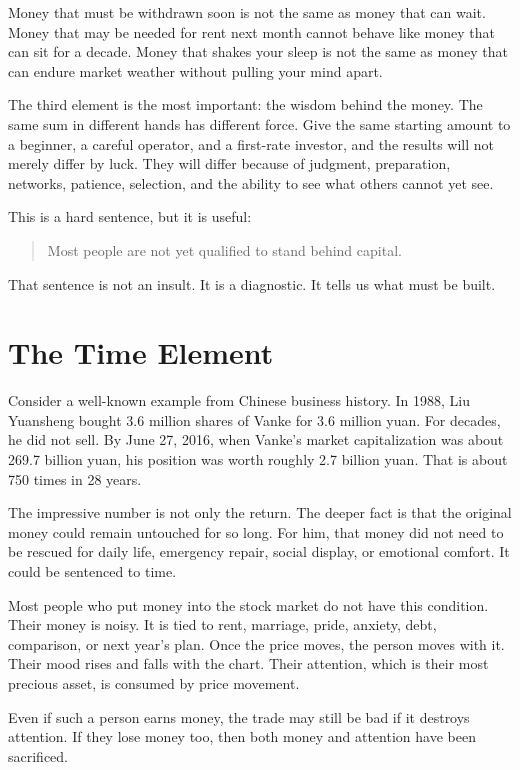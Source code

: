 Money that must be withdrawn soon is not the same as money that can wait. Money that may be needed for rent next month cannot behave like money that can sit for a decade. Money that shakes your sleep is not the same as money that can endure market weather without pulling your mind apart.

The third element is the most important: the wisdom behind the money. The same sum in different hands has different force. Give the same starting amount to a beginner, a careful operator, and a first-rate investor, and the results will not merely differ by luck. They will differ because of judgment, preparation, networks, patience, selection, and the ability to see what others cannot yet see.

This is a hard sentence, but it is useful:

\begin{quote}
Most people are not yet qualified to stand behind capital.
\end{quote}

That sentence is not an insult. It is a diagnostic. It tells us what must be built.

\section*{The Time Element}

Consider a well-known example from Chinese business history. In 1988, Liu Yuansheng bought 3.6 million shares of Vanke for 3.6 million yuan. For decades, he did not sell. By June 27, 2016, when Vanke's market capitalization was about 269.7 billion yuan, his position was worth roughly 2.7 billion yuan. That is about 750 times in 28 years.

The impressive number is not only the return. The deeper fact is that the original money could remain untouched for so long. For him, that money did not need to be rescued for daily life, emergency repair, social display, or emotional comfort. It could be sentenced to time.

Most people who put money into the stock market do not have this condition. Their money is noisy. It is tied to rent, marriage, pride, anxiety, debt, comparison, or next year's plan. Once the price moves, the person moves with it. Their mood rises and falls with the chart. Their attention, which is their most precious asset, is consumed by price movement.

Even if such a person earns money, the trade may still be bad if it destroys attention. If they lose money too, then both money and attention have been sacrificed.

